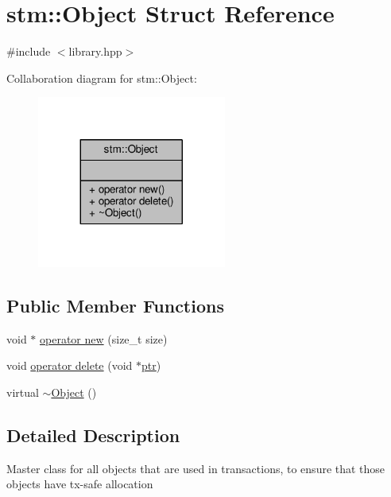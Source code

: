 \hypertarget{structstm_1_1Object}{\section{stm\-:\-:Object Struct Reference}
\label{structstm_1_1Object}
}


{\ttfamily \#include $<$library.\-hpp$>$}



Collaboration diagram for stm\-:\-:Object\-:
\nopagebreak
\begin{figure}[H]
\begin{center}
\leavevmode
\includegraphics[width=176pt]{structstm_1_1Object__coll__graph}
\end{center}
\end{figure}
\subsection*{Public Member Functions}
\begin{DoxyCompactItemize}
\item 
void $\ast$ \hyperlink{structstm_1_1Object_a0b63515053eb5f392c76da3d78e9519c}{operator new} (size\-\_\-t size)
\item 
void \hyperlink{structstm_1_1Object_afac8435413e9dccf8151b66fba9199ae}{operator delete} (void $\ast$\hyperlink{counted__ptr_8hpp_ac0fd97c9323e3a3981515b00166f14d8}{ptr})
\item 
virtual \hyperlink{structstm_1_1Object_a1c1b6f45d8438cd6470688d15f79225f}{$\sim$\-Object} ()
\end{DoxyCompactItemize}


\subsection{Detailed Description}
Master class for all objects that are used in transactions, to ensure that those objects have tx-\/safe allocation


